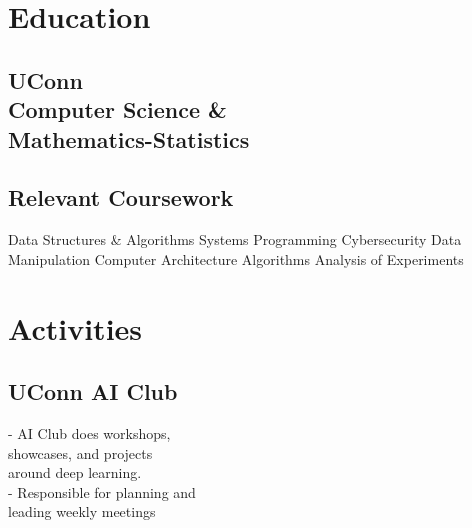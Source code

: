 \documentclass[]{resume-template}
\begin{document}
%
%
\lastupdated{}

%
%

%
%

\begin{minipage}[t]{0.33\textwidth}


    \section{Education}\label{sec:education}

    \subsection{UConn\\ Computer Science \&\\ 
    Mathematics-Statistics}\label{subsec:uconn}
    \vspace{\topsep}
    \subsection{Relevant Coursework}\label{subsec:coursework}
    Data Structures \& Algorithms \textbullet{} Systems Programming \textbullet{} Cybersecurity
    Data Manipulation \textbullet{}  Computer Architecture \textbullet{} Algorithms \textbullet{} Analysis of Experiments
    \sectionsep{}




    \section{Activities}\label{sec:activities}

    \subsection{UConn AI Club}\label{subsec:uconn-ai-club}
    - AI Club does workshops,\\showcases, and projects \\around deep learning.\\
    - Responsible for planning and\\ leading weekly meetings\\
    \vspace{\topsep}



\end{minipage}
\end{document}
